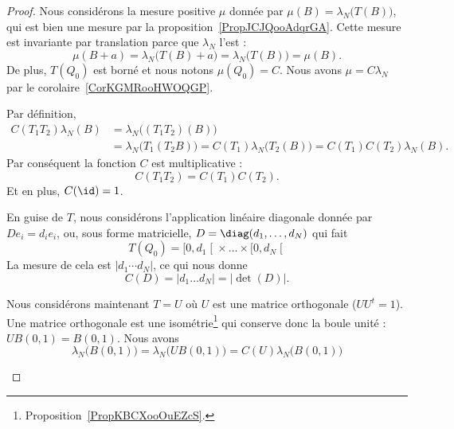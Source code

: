 \begin{proof}
	Nous considérons la mesure positive \( \mu\) donnée par \( \mu(B)=\lambda_N\big( T(B) \big)\), qui est bien une mesure par la proposition~\ref{PropJCJQooAdqrGA}. Cette mesure est invariante par translation parce que \( \lambda_N\) l'est :
	\begin{equation}
		\mu(B+a)=\lambda_N\big( T(B)+a \big)=\lambda_N\big( T(B) \big)=\mu(B).
	\end{equation}
	De plus, \( T(Q_0)\) est borné et nous notons \( \mu(Q_0)=C\). Nous avons \( \mu=C\lambda_N\) par le corolaire~\ref{CorKGMRooHWOQGP}.

	\begin{subproof}
		\item[\( C(T_1T_2)=C(T_1)C(T_2)\)]
		Par définition,
		\begin{subequations}
			\begin{align}
				C(T_1T_2)\lambda_N(B) & =\lambda_N\big( (T_1T_2)(B) \big)                                                           \\
				                      & =\lambda_N\big( T_1(T_2B) \big)=C(T_1)\lambda_N\big( T_2(B) \big)=C(T_1)C(T_2)\lambda_N(B).
			\end{align}
		\end{subequations}
		Par conséquent la fonction \( C\) est multiplicative :
		\begin{equation}
			C(T_1T_2)=C(T_1)C(T_2).
		\end{equation}
		Et en plus, \( C(\id)=1\).
		\item[Matrice diagonale]
		En guise de \( T\), nous considérons l'application linéaire diagonale donnée par \( De_i=d_ie_i\), ou, sous forme matricielle, \( D=\diag(d_1,\ldots, d_N)\) qui fait
		\begin{equation}
			T(Q_0)=\mathopen[ 0 , d_1 \mathclose[\times \ldots\times \mathopen[  0, d_N \mathclose[
		\end{equation}
		La mesure de cela est \( |d_1\cdots d_N|\), ce qui nous donne
		\begin{equation}
			C(D)=| d_1\ldots d_N |=| \det(D) |.
		\end{equation}
		\item[Matrice orthogonale]
		Nous considérons maintenant \( T=U\) où \( U\) est une matrice orthogonale (\( UU^t=1\)). Une matrice orthogonale est une isométrie\footnote{Proposition~\ref{PropKBCXooOuEZcS}.} qui conserve donc la boule unité : \( UB(0,1)=B(0,1)\). Nous avons
		\begin{equation}
			\lambda_N\big( B(0,1) \big)=\lambda_N\big( UB(0,1) \big)=C(U)\lambda_N\big( B(0,1) \big)

\end{equation}
\end{subproof}
\end{proof}
